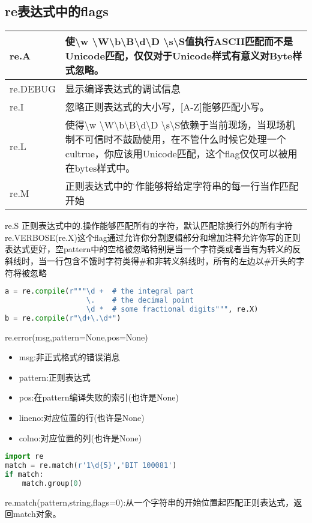 \documentclass{book}
\begin{document}
\subsection{re表达式中的flags}
\begin{tabular}{|p{2cm}|p{8cm}|}
\hline
re.A&使\textbackslash w \textbackslash W\textbackslash b\textbackslash B\textbackslash d\textbackslash D
\textbackslash s\textbackslash S值执行ASCII匹配而不是Unicode匹配，仅仅对于Unicode样式有意义对Byte样式忽略。\\
\hline
re.DEBUG&显示编译表达式的调试信息\\
\hline
re.I &忽略正则表达式的大小写，[A-Z]能够匹配小写。\\
\hline
re.L &使得\textbackslash w \textbackslash W\textbackslash b\textbackslash B\textbackslash d\textbackslash D
\textbackslash s\textbackslash S依赖于当前现场，当现场机制不可信时不鼓励使用，在不管什么时候它处理一个cultrue，你应该用Unicode匹配，这个flag仅仅可以被用在bytes样式中。\\
\hline
re.M &正则表达式中的\^操作能够将给定字符串的每一行当作匹配开始\\
\hline
\end{tabular}
re.S 正则表达式中的.操作能够匹配所有的字符，默认匹配除换行外的所有字符
re.VERBOSE(re.X)这个flag通过允许你分割逻辑部分和增加注释允许你写的正则表达式更好，空pattern中的空格被忽略特别是当一个字符类或者当有为转义的反斜线时，当一行包含不饿时字符类得\#和非转义斜线时，所有的左边以\#开头的字符将被忽略
\begin{lstlisting}[language=Python]
a = re.compile(r"""\d +  # the integral part
                   \.    # the decimal point
                   \d *  # some fractional digits""", re.X)
b = re.compile(r"\d+\.\d*")
\end{lstlisting}
re.error(msg,pattern=None,pos=None)
\begin{itemize}
        \item msg:非正式格式的错误消息
	\item pattern:正则表达式
	\item pos:在pattern编译失败的索引(也许是None)
	\item lineno:对应位置的行(也许是None)
	\item colno:对应位置的列(也许是None)
    \end{itemize}
\begin{lstlisting}[language=Python]
import re
match = re.match(r'1\d{5}','BIT 100081')
if match:
    match.group(0)
\end{lstlisting}
re.match(pattern,string,flags=0):从一个字符串的开始位置起匹配正则表达式，返回match对象。
\end{document}
